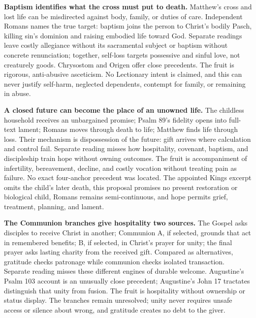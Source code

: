 \noindent\textbf{Baptism identifies what the cross must put to death.\enspace{}}
Matthew's cross and lost life can be misdirected against body, family, or duties of care. Independent Romans names the true target: baptism joins the person to Christ's bodily Pasch, killing sin's dominion and raising embodied life toward God. Separate readings leave costly allegiance without its sacramental subject or baptism without concrete renunciation; together, self-loss targets possessive and sinful love, not creaturely goods. Chrysostom and Origen offer close precedents. The fruit is rigorous, anti-abusive asceticism. No Lectionary intent is claimed, and this can never justify self-harm, neglected dependents, contempt for family, or remaining in abuse.

\noindent\textbf{A closed future can become the place of an unowned life.\enspace{}}
The childless household receives an unbargained promise; Psalm 89's fidelity opens into full-text lament; Romans moves through death to life; Matthew finds life through loss. Their mechanism is dispossession of the future: gift arrives where calculation and control fail. Separate reading misses how hospitality, covenant, baptism, and discipleship train hope without owning outcomes. The fruit is accompaniment of infertility, bereavement, decline, and costly vocation without treating pain as failure. No exact four-anchor precedent was located. The appointed Kings excerpt omits the child's later death, this proposal promises no present restoration or biological child, Romans remains semi-continuous, and hope permits grief, treatment, planning, and lament.

\noindent\textbf{The Communion branches give hospitality two sources.\enspace{}}
The Gospel asks disciples to receive Christ in another; Communion A, if selected, grounds that act in remembered benefits; B, if selected, in Christ's prayer for unity; the final prayer asks lasting charity from the received gift. Compared as alternatives, gratitude checks patronage while communion checks isolated transaction. Separate reading misses these different engines of durable welcome. Augustine's Psalm 103 account is an unusually close precedent; Augustine's John 17 tractates distinguish that unity from fusion. The fruit is hospitality without ownership or status display. The branches remain unresolved; unity never requires unsafe access or silence about wrong, and gratitude creates no debt to the giver.
